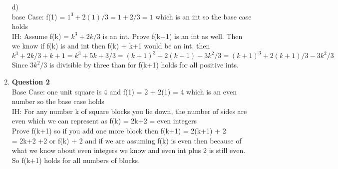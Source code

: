 \documentclass[12pt]{article}
\begin{document}
\begin{enumerate}
	
d) \\
	base Case: f(1) = $1^3 + 2(1) / 3 = 1+2/3 = 1$ which is an int so the base case holds \\
    IH: Assume f(k) = $k^3 + 2k /3 $ is an int. 
    Prove f(k+1) is an int as well. Then we know if f(k) is and int then 
    f(k) + k+1 would be an int. 
    then $k^3 + 2k /3 + k+1 = k^3 + 5k + 3/3 = (k+1)^3 + 2(k+1) - 3k^2/3 = (k+1)^3 + 2(k+1)/3 - 3k^2/3 $ \\Since $3k^2/3$ is divisible by three than for f(k+1) holds for all positive ints. \\
  
   

\item {\bf Question 2} \\
Base Case: one unit square is 4 and f(1) = 2 + 2(1) = 4 which is an even number so the base case holds \\
IH: For any number k of square blocks you lie down, the number of sides are even which we can represent as f(k) = 2k+2 = even integers\\
Prove f(k+1) so if you add one more block then f(k+1) = 2(k+1) + 2 \\
= 2k+2 +2 or f(k) + 2 and if we are assuming f(k) is even then because of what we know about even integers we know and even int plus 2 is still even. \\
So f(k+1) holds for all numbers of blocks. 


\end{enumerate}
\end{document}
